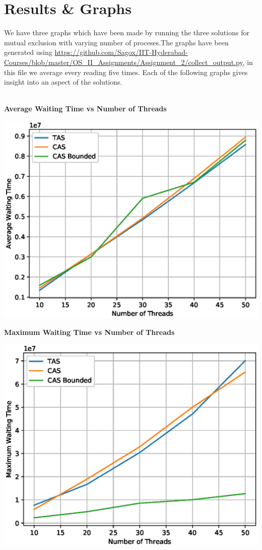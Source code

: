 \documentclass[a4paper,12pt]{report}
\begin{document}
\section{Results \& Graphs}
We have three graphs which have been made by running the three solutions for mutual exclusion with varying number of proceses.The graphs have been generated using \url{https://github.com/Sagox/IIT-Hyderabad-Courses/blob/master/OS_II_Assignments/Assignment_2/collect_output.py}, in this file we average every reading five times. Each of the following graphs gives insight into an aspect of the solutions.\\\\
\begin{center}
\begin{large}
\textbf{Average Waiting Time vs Number of Threads}
\end{large}
\includegraphics{avg.eps}
\end{center}
\begin{center}
\begin{large}
\textbf{Maximum Waiting Time vs Number of Threads}
\end{large}
\includegraphics{max.eps}
\end{center}
\end{document}

